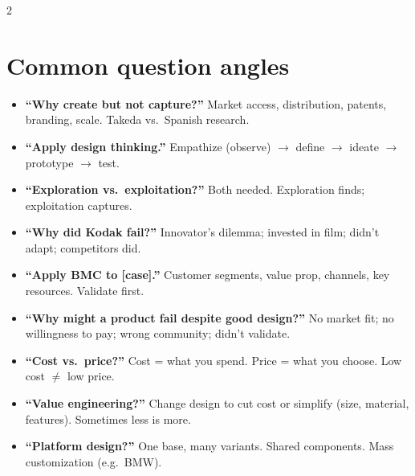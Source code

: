 \documentclass[8pt,landscape,a4paper]{article}
\newcommand{\handnote}[1]{\marginnote{\raggedright\footnotesize\color{notegrey}\textit{#1}\vspace{0.4em}}}
\newcommand{\hlpeach}[1]{\textcolor{eublue}{\textbf{#1}}}
\begin{document}
\begin{multicols}{2}
\section*{\hlpeach{Common question angles}}\handnote{Memorise these.}
\begin{itemize}[leftmargin=*,nosep]
\item \textbf{``Why create but not capture?''} Market access, distribution, patents, branding, scale. Takeda vs.\ Spanish research.
\item \textbf{``Apply design thinking.''} Empathize (observe) $\to$ define $\to$ ideate $\to$ prototype $\to$ test.
\item \textbf{``Exploration vs.\ exploitation?''} Both needed. Exploration finds; exploitation captures.
\item \textbf{``Why did Kodak fail?''} Innovator's dilemma; invested in film; didn't adapt; competitors did.
\item \textbf{``Apply BMC to [case].''} Customer segments, value prop, channels, key resources. Validate first.
\item \textbf{``Why might a product fail despite good design?''} No market fit; no willingness to pay; wrong community; didn't validate.
\item \textbf{``Cost vs.\ price?''} Cost = what you spend. Price = what you choose. Low cost $\neq$ low price.
\item \textbf{``Value engineering?''} Change design to cut cost or simplify (size, material, features). Sometimes less is more.
\item \textbf{``Platform design?''} One base, many variants. Shared components. Mass customization (e.g.\ BMW).
\end{itemize}

\end{multicols}
\end{document}
